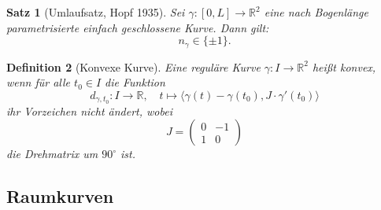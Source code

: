 \documentclass[a4paper,12pt]{article}
\theoremstyle{break}
\newtheorem{definition}{Definition}[section]
\newtheorem{theorem}[definition]{Satz}
\begin{document}
\begin{theorem}[Umlaufsatz, Hopf 1935]
Sei \( \gamma: [0,L] \to \mathbb{R}^2 \) eine nach Bogenlänge parametrisierte einfach geschlossene Kurve.  
Dann gilt:
\[
n_{\gamma} \in \{ \pm 1 \}.
\]
\end{theorem}

\begin{definition}[Konvexe Kurve]
Eine reguläre Kurve \( \gamma: I \to \mathbb{R}^2 \) heißt \emph{konvex}, wenn für alle \( t_0 \in I \) die Funktion  
\[
d_{\gamma,t_0} : I \to \mathbb{R}, \quad t \mapsto \langle \gamma(t) - \gamma(t_0), J \cdot \gamma'(t_0) \rangle
\]
ihr Vorzeichen nicht ändert, wobei  
\[
J = \begin{pmatrix} 0 & -1 \\ 1 & 0 \end{pmatrix}
\]
die Drehmatrix um \( 90^\circ \) ist.
\end{definition}

\subsection{Raumkurven}
\end{document}
